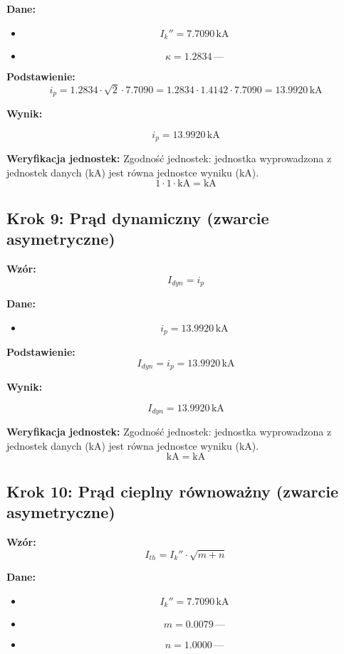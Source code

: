 \documentclass[11pt,a4paper]{article}
\begin{document}
\textbf{Dane:}
\begin{itemize}
  \item
$$
I_k'' = 7.7090\,\mathrm{kA}
$$
  \item
$$
\kappa = 1.2834\,\text{—}
$$
\end{itemize}

\textbf{Podstawienie:}
$$
i_p = 1.2834 \cdot \sqrt{2} \cdot 7.7090 = 1.2834 \cdot 1.4142 \cdot 7.7090 = 13.9920\,\text{kA}
$$

\textbf{Wynik:}
\begin{center}
$$
i_p = 13.9920\,\mathrm{kA}
$$
\end{center}

\textbf{Weryfikacja jednostek:} Zgodność jednostek: jednostka wyprowadzona z jednostek danych (kA) jest równa jednostce wyniku (kA).
$$
1 \cdot 1 \cdot \mathrm{kA} = \mathrm{kA}
$$

\subsection{Krok 9: Prąd dynamiczny (zwarcie asymetryczne)}

\textbf{Wzór:}
$$
I_{dyn} = i_p
$$

\textbf{Dane:}
\begin{itemize}
  \item
$$
i_p = 13.9920\,\mathrm{kA}
$$
\end{itemize}

\textbf{Podstawienie:}
$$
I_{dyn} = i_p = 13.9920\,\text{kA}
$$

\textbf{Wynik:}
\begin{center}
$$
I_{dyn} = 13.9920\,\mathrm{kA}
$$
\end{center}

\textbf{Weryfikacja jednostek:} Zgodność jednostek: jednostka wyprowadzona z jednostek danych (kA) jest równa jednostce wyniku (kA).
$$
\mathrm{kA} = \mathrm{kA}
$$

\subsection{Krok 10: Prąd cieplny równoważny (zwarcie asymetryczne)}

\textbf{Wzór:}
$$
I_{th} = I_k'' \cdot \sqrt{m + n}
$$

\textbf{Dane:}
\begin{itemize}
  \item
$$
I_k'' = 7.7090\,\mathrm{kA}
$$
  \item
$$
m = 0.0079\,\text{—}
$$
  \item
$$
n = 1.0000\,\text{—}
$$
\end{itemize}
\end{document}
